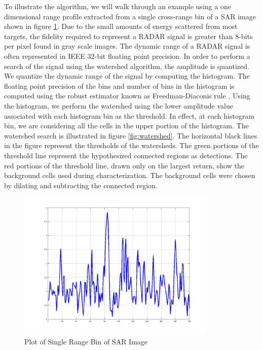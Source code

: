 \documentclass[journal]{IEEEtran}
\begin{document}
\par To illustrate the algorithm, we will walk through an example using a one dimensional range profile extracted from a single cross-range bin of a SAR image shown in figure \ref{fig:sarhrr}. Due to the small amounts of energy scattered from most targets, the fidelity required to represent a RADAR signal is greater than 8-bits per pixel found in gray scale images. The dynamic range of a RADAR signal is often represented in IEEE 32-bit floating point precision. In order to perform a search of the signal using the watershed algorithm, the amplitude is quantized. We quantize the dynamic range of the signal by computing the histogram. The floating point precision of the bins and number of bins in the histogram is computed using the robust estimator known as Freedman-Diaconis rule \cite{freedman}. Using the histogram, we perform the watershed using the lower amplitude value associated with each histogram bin as the threshold. In effect, at each histogram bin, we are considering all the cells in the upper portion of the histogram. The watershed search is illustrated in figure \ref{fig:watershed}. The horizontal black lines in the figure represent the  thresholds of the watersheds. The green portions of the threshold line represent the hypothesized connected regions as detections. The red portions of the threshold line, drawn only on the largest return, show the background cells used during characterization. The background cells were chosen by dilating and subtracting the connected region.

\begin{figure}[!h]
\centering
\includegraphics[width=3.75in]{../images/hrr.png}
\caption{Plot of Single Range Bin of SAR Image}
\label{fig:sarhrr}
\end{figure}
\end{document}
